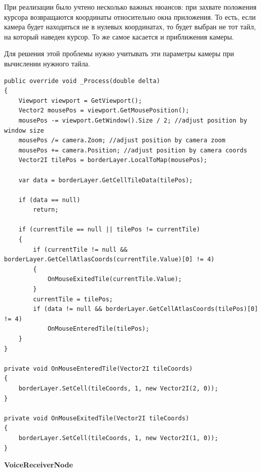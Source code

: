            При реализации было учтено несколько важных нюансов: при захвате положения курсора возвращаются координаты относительно окна приложения. То есть, если камера будет находиться не в нулевых координатах, то будет выбран не тот тайл, на который наведен курсор. То же самое касается и приближения камеры.

            Для решения этой проблемы нужно учитывать эти параметры камеры при вычислении нужного тайла.

            \begin{lstlisting}[caption=Реализация подсветки тайла]
public override void _Process(double delta)
{
    Viewport viewport = GetViewport();
    Vector2 mousePos = viewport.GetMousePosition();
    mousePos -= viewport.GetWindow().Size / 2; //adjust position by window size
    mousePos /= camera.Zoom; //adjust position by camera zoom
    mousePos += camera.Position; //adjust position by camera coords
    Vector2I tilePos = borderLayer.LocalToMap(mousePos);

    var data = borderLayer.GetCellTileData(tilePos);

    if (data == null)
        return;

    if (currentTile == null || tilePos != currentTile)
    {
        if (currentTile != null && borderLayer.GetCellAtlasCoords(currentTile.Value)[0] != 4)
        {
            OnMouseExitedTile(currentTile.Value);
        }
        currentTile = tilePos;
        if (data != null && borderLayer.GetCellAtlasCoords(tilePos)[0] != 4)
            OnMouseEnteredTile(tilePos);
    }
}

private void OnMouseEnteredTile(Vector2I tileCoords)
{
    borderLayer.SetCell(tileCoords, 1, new Vector2I(2, 0));
}

private void OnMouseExitedTile(Vector2I tileCoords)
{
    borderLayer.SetCell(tileCoords, 1, new Vector2I(1, 0));
}
            \end{lstlisting}


            \textbf{VoiceReceiverNode}

